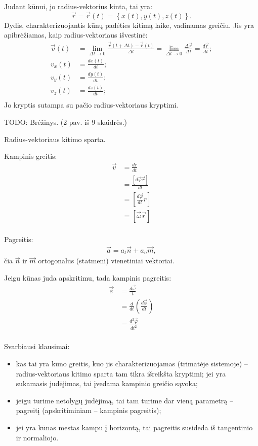 Judant kūnui, jo radius-vektorius kinta, tai yra:
\begin{equation*}
  \vec{r} = \vec{r}(t) = \left\{ x(t), y(t), z(t) \right\}.
\end{equation*}
Dydis, charakterizuojantis kūnų padėties kitimą laike, vadinamas
greičiu. Jis yra apibrėžiamas, kaip radius-vektoriaus išvestinė:
\begin{align*}
  \vec{v}(t)
    &= \lim_{\Delta t \to 0}
      \frac{\vec{r}(t + \Delta t) - \vec{r}(t)}{\Delta t}
    = \lim_{\Delta t \to 0} \frac{\Delta \vec{r}}{\Delta t}
    = \frac{d \vec{r}}{dt}; \\
  v_{x}(t) &= \frac{dx(t)}{dt}; \\
  v_{y}(t) &= \frac{dy(t)}{dt}; \\
  v_{z}(t) &= \frac{dz(t)}{dt}; \\
\end{align*}
Jo kryptis sutampa su pačio radius-vektoriaus kryptimi.

TODO: Brėžinys. (2 pav. iš 9 skaidrės.)

\begin{defn}[Greitis]
  Radius-vektoriaus kitimo sparta.
\end{defn}

Kampinis greitis:
\begin{align*}
  \vec{v}
  &= \frac{dr}{dt} \\
  &= \frac{\left[ d\vec{\varphi} \vec{r} \right]}{dt} \\
  &= \left[ \frac{d\vec{\varphi}}{dt}r \right] \\
  &= \left[ \vec{\omega}\vec{r} \right] \\
\end{align*}

Pagreitis:
\begin{align*}
  \vec{a} = a_{t} \vec{n} + a_{n} \vec{m},
\end{align*}
čia $\vec{n}$ ir $\vec{m}$ ortogonalūs (statmeni) vienetiniai vektoriai. 

Jeigu kūnas juda apskritimu, tada kampinis pagreitis:
\begin{align*}
  \vec{\varepsilon}
  &= \frac{d\vec{\omega}}{t} \\
  &= \frac{d}{dt}\left( \frac{d\vec{\varphi}}{dt} \right) \\
  &= \frac{d^{2} \vec{\varphi}}{dt^{2}} \\
\end{align*}

Svarbiausi klausimai:
\begin{itemize}
  \item kas tai yra kūno greitis, kuo jis charakterizuojamas (trimatėje
    sistemoje) – radius-vektoriaus kitimo sparta tam tikra išreikšta
    kryptimi; jei yra sukamasis judėjimas, tai įvedama kampinio greičio
    sąvoka;
  \item jeigu turime netolygų judėjimą, tai tam turime dar vieną parametrą
    – pagreitį (apskritiminiam – kampinis pagreitis);
  \item jei yra kūnas mestas kampu į horizontą, tai pagreitis susideda
    iš tangentinio ir normaliojo.
\end{itemize}

